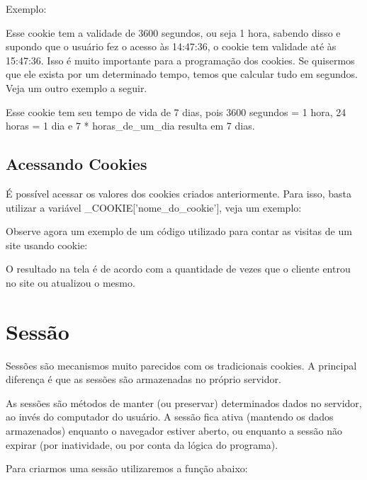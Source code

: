 Exemplo:



Esse cookie tem a validade de 3600 segundos, ou seja 1 hora,  sabendo disso e supondo que o usuário fez o acesso às 14:47:36, o cookie tem validade até às 15:47:36. Isso é muito importante para a programação dos cookies. Se quisermos que ele exista por um determinado tempo, temos que calcular tudo em segundos. Veja um outro exemplo a seguir.



Esse cookie tem seu tempo de vida de 7 dias, pois 3600 segundos = 1 hora, 24 horas = 1 dia e 7 * horas_de_um_dia resulta em 7 dias.

\subsection{Acessando Cookies}
\label{acessando-cookies}

É possível acessar os valores dos cookies criados anteriormente. Para isso, basta utilizar a variável \textdollar_COOKIE['nome_do_cookie'], veja um exemplo:



Observe agora um exemplo de um código utilizado para contar as visitas de um site usando cookie:



O resultado na tela é de acordo com a quantidade de vezes que o cliente entrou no site ou atualizou o mesmo.

\section{Sessão}
\label{sessao}

Sessões são mecanismos muito parecidos com os tradicionais cookies. A principal diferença é que as sessões são armazenadas no próprio servidor.

As sessões são métodos de manter (ou preservar) determinados dados no servidor, ao invés do computador do usuário. A sessão fica ativa (mantendo os dados armazenados) enquanto o navegador estiver aberto, ou enquanto a sessão não expirar (por inatividade, ou por conta da lógica do programa).

Para criarmos uma sessão utilizaremos a função abaixo:

